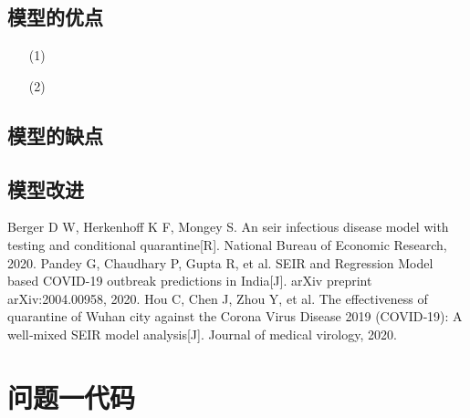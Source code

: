 \documentclass{whutmod}
\begin{document}
		\subsection{模型的优点}
			\begin{itemize}                                             
			\item [(1)]
			\item [(2)] 	
			\end{itemize}
		\subsection{模型的缺点}

  		\subsection{模型改进}

  
  
 
	\newpage	%
	\nocite{*}		%
	\begin{thebibliography}{9}%
		Berger D W, Herkenhoff K F, Mongey S. An seir infectious disease model with testing and conditional quarantine[R]. National Bureau of Economic Research, 2020.
	Pandey G, Chaudhary P, Gupta R, et al. SEIR and Regression Model based COVID-19 outbreak predictions in India[J]. arXiv preprint arXiv:2004.00958, 2020.
	Hou C, Chen J, Zhou Y, et al. The effectiveness of quarantine of Wuhan city against the Corona Virus Disease 2019 (COVID‐19): A well‐mixed SEIR model analysis[J]. Journal of medical virology, 2020.
	\end{thebibliography}

	\newpage
	\appendix %
	\section{问题一代码}
\end{document}
